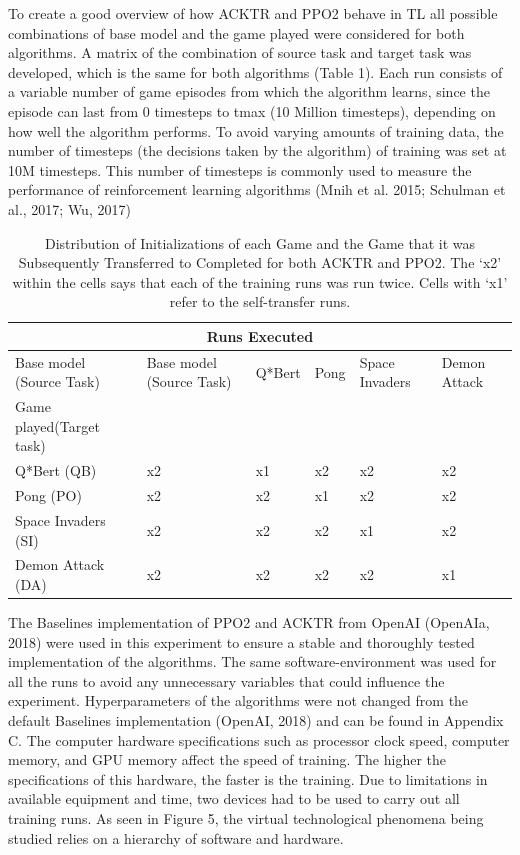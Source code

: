 To create a good overview of how ACKTR and PPO2 behave in TL all possible combinations of base model and the game played were considered for both algorithms. A matrix of the combination of source task and target task was developed, which is the same for both algorithms (Table 1). Each run consists of a variable number of game episodes from which the algorithm learns, since the episode can last from 0 timesteps to tmax (10 Million timesteps), depending on how well the algorithm performs. To avoid varying amounts of training data, the number of timesteps (the decisions taken by the algorithm) of training was set at 10M timesteps. This number of timesteps is commonly used to measure the performance of reinforcement learning algorithms (Mnih et al. 2015; Schulman et al., 2017; Wu, 2017) 
\begin{table}[]
	\begin{tabular}{llllll}
		\hline
		\multicolumn{6}{c}{Runs Executed}                                                                   \\ \hline
		Base model (Source Task) & Base model (Source Task) & Q*Bert & Pong & Space Invaders & Demon Attack \\
		Game played(Target task) &                          &        &      &                &              \\
		Q*Bert (QB)              & x2                       & x1     & x2   & x2             & x2           \\
		Pong (PO)                & x2                       & x2     & x1   & x2             & x2           \\
		Space Invaders (SI)      & x2                       & x2     & x2   & x1             & x2           \\
		Demon Attack (DA)        & x2                       & x2     & x2   & x2             & x1           \\ \hline
	\end{tabular}
	\caption{Distribution of Initializations of each Game and the Game that it was Subsequently Transferred to Completed for both ACKTR and PPO2. The ‘x2’ within the cells says that each of the training runs was run twice. Cells with ‘x1’ refer to the self-transfer runs.}
\end{table}

The Baselines implementation of PPO2 and ACKTR from OpenAI (OpenAIa, 2018) were used in this experiment to ensure a stable and thoroughly tested implementation of the algorithms. 
The same software-environment was used for all the runs to avoid any unnecessary variables that could influence the experiment.
Hyperparameters of the algorithms were not changed from the default Baselines implementation (OpenAI, 2018) and can be found in Appendix C. The computer hardware specifications such as processor clock speed, computer memory, and GPU memory affect the speed of training. The higher the specifications of this hardware, the faster is the training. Due to limitations in available equipment and time, two devices had to be used to carry out all training runs. As seen in Figure 5, the virtual technological phenomena being studied relies on a hierarchy of software and hardware. 

